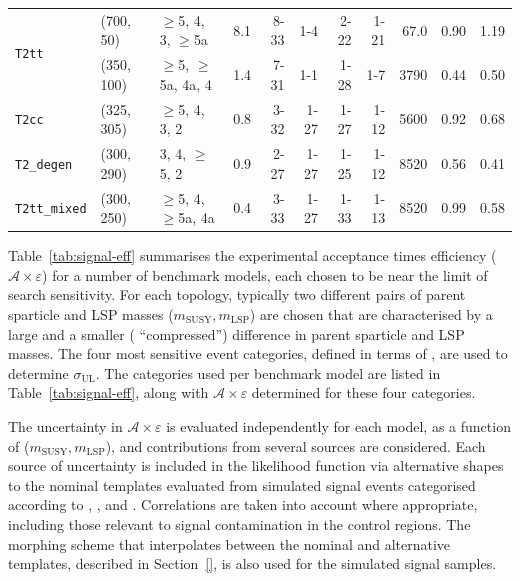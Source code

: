 \begin{table}[tb]
\begin{tabular}{ lllcrrrrrcc }
    \multirow{2}{*}{\texttt{T2tt}}
  & (700, 50)   & $\geq$5, 4, 3, $\geq$5a  & \phantom{1}8.1 & 8-33  & 1-4   & 2-22  & 1-21 & 67.0 & 0.90 & 1.19 \\
  & (350, 100)  & $\geq$5, $\geq$5a, 4a, 4 & \phantom{1}1.4 & 7-31  & 1-1   & 1-28  & 1-7  & 3790 & 0.44 & 0.50 \\ [0.5ex]
    \multirow{1}{*}{\texttt{T2cc}}
  & (325, 305)  & $\geq$5, 4, 3, 2         & \phantom{1}0.8 & 3-32  & 1-27  & 1-27  & 1-12 & 5600 & 0.92 & 0.68 \\ [0.5ex]
    \multirow{1}{*}{\texttt{T2\_degen}}
  & (300, 290)  & 3, 4, $\geq$5, 2         & \phantom{1}0.9 & 2-27  & 1-27  & 1-25  & 1-12 & 8520 & 0.56 & 0.41 \\ [0.5ex]
    \multirow{1}{*}{\texttt{T2tt\_mixed}}
  & (300, 250)  & $\geq$5, 4, $\geq$5a, 4a & \phantom{1}0.4 & 3-33  & 1-27  & 1-33  & 1-13 & 8520 & 0.99 & 0.58 \\ [0.5ex]
    \hline
  \end{tabular}
\end{table}

Table~\ref{tab:signal-eff} summarises the experimental acceptance
times efficiency ($\mathcal{A}\times\varepsilon$) for a number of
benchmark models, each chosen to be near the limit of search
sensitivity. For each topology, typically two different pairs of
parent sparticle and LSP masses ($m_\text{SUSY}, m_\text{LSP}$) are
chosen that are characterised by a large and a smaller (\ie
``compressed'') difference in parent sparticle and LSP masses. The
four most sensitive event categories, defined in terms of \njet, are
used to determine $\sigma_\text{UL}$. The categories used per
benchmark model are listed in Table~\ref{tab:signal-eff}, along with
$\mathcal{A}\times\varepsilon$ determined for these four categories.

The uncertainty in $\mathcal{A}\times\varepsilon$ is evaluated
independently for each model, as a function of ($m_\text{SUSY},
m_\text{LSP}$), and contributions from several sources are
considered. Each source of uncertainty is included in the likelihood
function via alternative shapes to the nominal \HTmiss templates
evaluated from simulated signal events categorised according to \njet,
\nb, and \scalht. Correlations are taken into account where
appropriate, including those relevant to signal contamination in the
control regions. The morphing scheme that interpolates between the
nominal and alternative \HTmiss templates, described in Section~\ref{},
is also used for the simulated signal samples.

